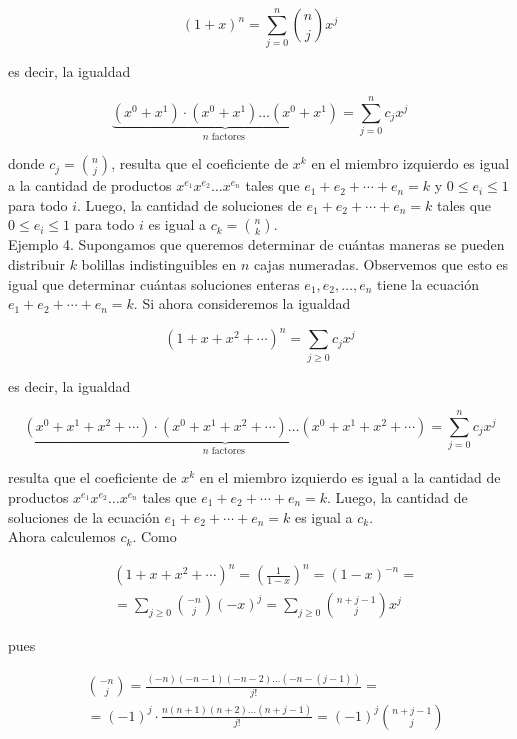 \documentclass[10pt]{article}
\begin{document}
$$
(1+x)^{n}=\sum_{j=0}^{n}\binom{n}{j} x^{j}
$$

es decir, la igualdad

$$
\underbrace{\left(x^{0}+x^{1}\right) \cdot\left(x^{0}+x^{1}\right) \ldots\left(x^{0}+x^{1}\right)}_{n \text { factores }}=\sum_{j=0}^{n} c_{j} x^{j}
$$

donde $c_{j}=\binom{n}{j}$, resulta que el coeficiente de $x^{k}$ en el miembro izquierdo es igual a la cantidad de productos $x^{e_{1}} x^{e_{2}} \ldots x^{e_{n}}$ tales que $e_{1}+e_{2}+\cdots+e_{n}=k$ y $0 \leq e_{i} \leq 1$ para todo $i$. Luego, la cantidad de soluciones de $e_{1}+e_{2}+\cdots+e_{n}=k$ tales que $0 \leq e_{i} \leq 1$ para todo $i$ es igual a $c_{k}=\binom{n}{k}$.\\
Ejemplo 4. Supongamos que queremos determinar de cuántas maneras se pueden distribuir $k$ bolillas indistinguibles en $n$ cajas numeradas. Observemos que esto es igual que determinar cuántas soluciones enteras $e_{1}, e_{2}, \ldots, e_{n}$ tiene la ecuación $e_{1}+e_{2}+\cdots+e_{n}=k$. Si ahora consideremos la igualdad

$$
\left(1+x+x^{2}+\cdots\right)^{n}=\sum_{j \geq 0} c_{j} x^{j}
$$

es decir, la igualdad

$$
\underbrace{\left(x^{0}+x^{1}+x^{2}+\cdots\right) \cdot\left(x^{0}+x^{1}+x^{2}+\cdots\right) \ldots\left(x^{0}+x^{1}+x^{2}+\cdots\right)}_{n \text { factores }}=\sum_{j=0}^{n} c_{j} x^{j}
$$

resulta que el coeficiente de $x^{k}$ en el miembro izquierdo es igual a la cantidad de productos $x^{e_{1}} x^{e_{2}} \ldots x^{e_{n}}$ tales que $e_{1}+e_{2}+\cdots+e_{n}=k$. Luego, la cantidad de soluciones de la ecuación $e_{1}+e_{2}+\cdots+e_{n}=k$ es igual a $c_{k}$.\\
Ahora calculemos $c_{k}$. Como

$$
\begin{aligned}
& \left(1+x+x^{2}+\cdots\right)^{n}=\left(\frac{1}{1-x}\right)^{n}=(1-x)^{-n}= \\
& =\sum_{j \geq 0}\binom{-n}{j}(-x)^{j}=\sum_{j \geq 0}\binom{n+j-1}{j} x^{j}
\end{aligned}
$$

pues

$$
\begin{aligned}
& \binom{-n}{j}=\frac{(-n)(-n-1)(-n-2) \ldots(-n-(j-1))}{j!}= \\
& =(-1)^{j} \cdot \frac{n(n+1)(n+2) \ldots(n+j-1)}{j!}=(-1)^{j}\binom{n+j-1}{j}
\end{aligned}
$$
\end{document}
